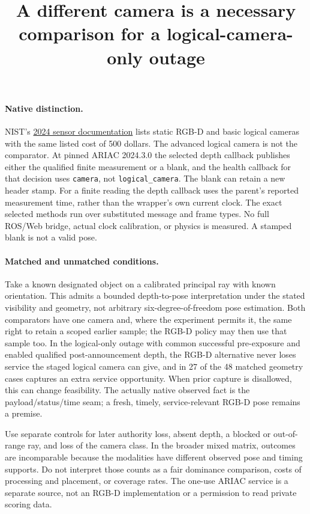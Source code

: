 \documentclass{article}
\begin{document}
\title{A different camera is a necessary comparison for a logical-camera-only outage}
\maketitle

\paragraph{Native distinction.}
NIST's \href{https://pages.nist.gov/ARIAC_docs/en/2024.1.0/competition/sensors.html}{2024 sensor documentation}
lists static RGB-D and basic logical cameras with the same
listed cost of 500 dollars. The advanced logical camera is
not the comparator. At pinned ARIAC 2024.3.0 the selected
depth callback publishes either the qualified finite measurement
or a blank, and the health callback for that decision uses
\texttt{camera}, not \texttt{logical\_camera}.
The blank can retain a new header stamp. For a finite reading
the depth callback uses the parent's reported measurement time,
rather than the wrapper's own current clock.
The exact selected methods run over substituted message and
frame types. No full ROS/Web bridge, actual clock calibration,
or physics is measured. A stamped blank is not a valid pose.

\paragraph{Matched and unmatched conditions.}
Take a known designated object on a calibrated principal ray
with known orientation. This admits a bounded depth-to-pose
interpretation under the stated visibility and geometry, not
arbitrary six-degree-of-freedom pose estimation. Both comparators
have one camera and, where the experiment permits it, the same
right to retain a scoped earlier sample; the RGB-D policy may
then use that sample too. In the logical-only outage with
common successful pre-exposure and enabled qualified
post-announcement depth, the RGB-D alternative never loses
service the staged logical camera can give, and in 27 of the 48
matched geometry cases captures an extra service opportunity.
When prior capture is disallowed, this can change feasibility.
The actually native observed fact is the payload/status/time seam;
a fresh, timely, service-relevant RGB-D pose remains a premise.

Use separate controls for later authority loss, absent depth,
a blocked or out-of-range ray, and loss of the camera class.
In the broader mixed matrix, outcomes are incomparable because
the modalities have different observed pose and timing supports.
Do not interpret those counts as a fair dominance comparison,
costs of processing and placement, or coverage rates. The
one-use ARIAC service is a separate source, not an RGB-D
implementation or a permission to read private scoring data.
\end{document}
